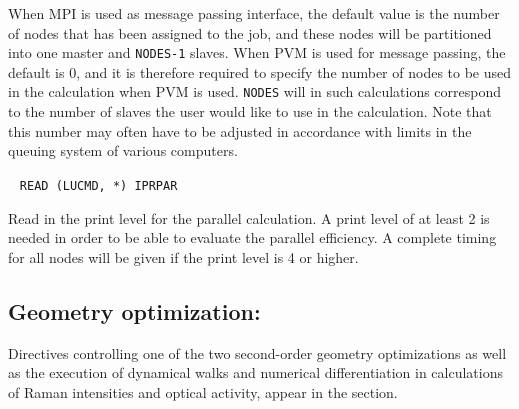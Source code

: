\begin{description}
When MPI is used as message passing interface, the
default value is the number of nodes that has been assigned to the
job, and these nodes will be partitioned into one master and
\verb|NODES-1| slaves. When PVM is used for message
passing, the default is 0,  and it is
therefore required to specify the number of nodes to be used in the
calculation when PVM is used. \verb|NODES| will in such calculations
correspond to the number of slaves the user would like to use in the
calculation. Note that this number may often have to be adjusted in
accordance with limits in the queuing system of various computers.

%
%
\item[\Key{PRINT}]\verb| |\newline
\verb|READ (LUCMD, *) IPRPAR|

Read in the print level for the parallel calculation. A print level of
at least 2 is needed in order to be able to evaluate the
parallel efficiency. A complete
timing for all nodes will be
given if the print level is 4 or higher.
\end{description}

\subsection{Geometry optimization: }
\label{sec:abawalk}

Directives controlling one of the two second-order
geometry
optimizations  as well as the
execution of dynamical walks and numerical
differentiation in
calculations of Raman intensities and optical activity,
appear in the  section.

